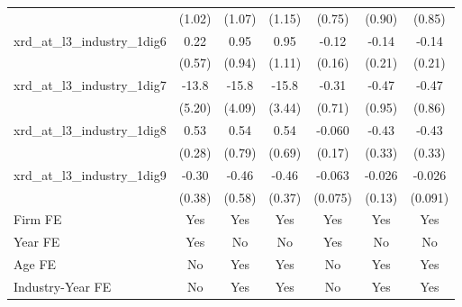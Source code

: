 {\begin{tabular}{l*{6}{c}}
                    &      (1.02)         &      (1.07)         &      (1.15)         &      (0.75)         &      (0.90)         &      (0.85)         \\
\addlinespace
xrd\_at\_l3\_industry\_1dig6&        0.22         &        0.95         &        0.95         &       -0.12         &       -0.14         &       -0.14         \\
                    &      (0.57)         &      (0.94)         &      (1.11)         &      (0.16)         &      (0.21)         &      (0.21)         \\
\addlinespace
xrd\_at\_l3\_industry\_1dig7&       -13.8\sym{***}&       -15.8\sym{***}&       -15.8\sym{***}&       -0.31         &       -0.47         &       -0.47         \\
                    &      (5.20)         &      (4.09)         &      (3.44)         &      (0.71)         &      (0.95)         &      (0.86)         \\
\addlinespace
xrd\_at\_l3\_industry\_1dig8&        0.53\sym{*}  &        0.54         &        0.54         &      -0.060         &       -0.43         &       -0.43         \\
                    &      (0.28)         &      (0.79)         &      (0.69)         &      (0.17)         &      (0.33)         &      (0.33)         \\
\addlinespace
xrd\_at\_l3\_industry\_1dig9&       -0.30         &       -0.46         &       -0.46         &      -0.063         &      -0.026         &      -0.026         \\
                    &      (0.38)         &      (0.58)         &      (0.37)         &     (0.075)         &      (0.13)         &     (0.091)         \\
\addlinespace
Firm FE             &         Yes         &         Yes         &         Yes         &         Yes         &         Yes         &         Yes         \\
\addlinespace
Year FE             &         Yes         &          No         &          No         &         Yes         &          No         &          No         \\
\addlinespace
Age FE              &          No         &         Yes         &         Yes         &          No         &         Yes         &         Yes         \\
\addlinespace
Industry-Year FE    &          No         &         Yes         &         Yes         &          No         &         Yes         &         Yes         \\

\end{tabular}}
